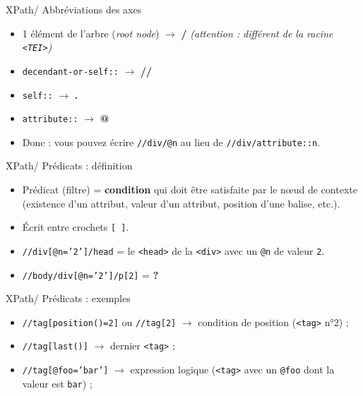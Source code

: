 \documentclass{beamer}
\begin{document}
    \begin{frame}{XPath/ Abbréviations des axes}
    \Large
        \begin{itemize}
            \item 1 élément de l'arbre (\textit{root node}) $\rightarrow$ \textbf{/} \textit{(attention : différent de la racine \texttt{<TEI>})}
            \item \texttt{decendant-or-self::} $\rightarrow$ \textbf{//}
            \item \texttt{self::} $\rightarrow$ \textbf{.}
            \item \texttt{attribute::} $\rightarrow$ \textbf{@}
            \bigskip
            \item Donc : vous pouvez écrire \texttt{//div/@n} au lieu de \texttt{//div/attribute::n}.
        \end{itemize}
    \end{frame}
    
    \begin{frame}{XPath/ Prédicats : définition}
        \Large
        \begin{itemize}
            \item Prédicat (filtre) = \textbf{condition} qui doit être satisfaite par le n\oe ud de contexte (existence d'un attribut, valeur d'un attribut, position d'une balise, etc.).
            \item Écrit entre crochets \texttt{[ ]}.
            \bigskip
            \item \texttt{//div[@n='2']/head} = le \texttt{<head>} de la \texttt{<div>} avec un \texttt{@n} de valeur \texttt{2}.
            \bigskip
            \item \texttt{//body/div[@n='2']/p[2]} = \textbf{?}
        \end{itemize}
    \end{frame}

    \begin{frame}{XPath/ Prédicats : exemples}
        \Large
        \begin{itemize}
            \item \texttt{//tag[position()=2]} ou \texttt{//tag[2]} $\rightarrow$ condition de position (\texttt{<tag>} n°2) ;
            \bigskip
            \item \texttt{//tag[last()]} $\rightarrow$ dernier \texttt{<tag>} ;
            \bigskip
            \item \texttt{//tag[@foo='bar']} $\rightarrow$ expression logique (\texttt{<tag>} avec un \texttt{@foo} dont la valeur est \texttt{bar}) ;
        \end{itemize}
    \end{frame}
\end{document}
